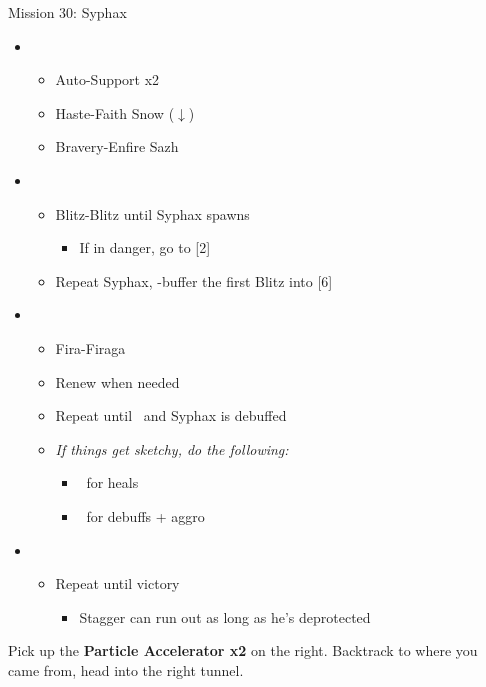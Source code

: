 \begin{battle}{Mission 30: Syphax}
	\begin{itemize}
		\item \third
			\begin{itemize}
				\item Auto-Support x2
				\item Haste-Faith Snow ($\downarrow$)
				\item Bravery-Enfire Sazh
			\end{itemize}
		\item \first
			\begin{itemize}
				\item Blitz-Blitz until Syphax spawns
					\begin{itemize}
						\item If in danger, go to [2]
					\end{itemize}
				\item Repeat Syphax, \rav-buffer the first Blitz into [6]
			\end{itemize}
		\item \sixth
			\begin{itemize}
				\item Fira-Firaga
				\item Renew when needed
				\item Repeat until \stagger~and Syphax is debuffed
				\item \textit{If things get sketchy, do the following:}
					\begin{itemize}
						\item \second~for heals
						\item \fifth~for debuffs + aggro
					\end{itemize}
			\end{itemize}
		\item \first
			\begin{itemize}
				\item Repeat until victory
					\begin{itemize}
						\item Stagger can run out as long as he's deprotected
					\end{itemize}
			\end{itemize}
	\end{itemize}
\end{battle}

Pick up the \textbf{Particle Accelerator x2} on the right.
Backtrack to where you came from, head into the right tunnel.

